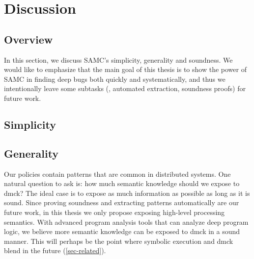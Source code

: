 



\chapter{Discussion}
\label{discuss}


\section{Overview}
In this section, we discuss SAMC's simplicity, generality and soundness.
We would like to emphasize that the main goal of this thesis is to show the
power of SAMC in finding deep bugs both quickly and systematically, and
thus we intentionally leave some subtasks (\eg, automated extraction,
soundness proofs) for future work.


\section{Simplicity}



\section{Generality}
\label{sam-general}

Our policies contain patterns that are common in distributed systems.  One
natural question to ask is: how much semantic knowledge should we expose to
dmck?  The ideal case is to expose as much information as possible as long
as it is sound.  Since proving soundness and extracting patterns
automatically are our future work, in this thesis we only propose exposing
high-level processing semantics.  With advanced program analysis tools that
can analyze deep program logic, we believe more semantic knowledge can be
exposed to dmck in a sound manner.
%
%
This will perhaps be the point where symbolic execution and
dmck blend in the future (\sec\ref{sec-related}).


